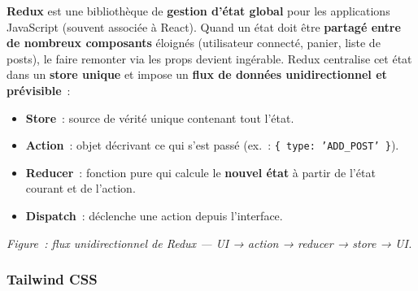 \noindent \textbf{Redux} est une bibliothèque de \textbf{gestion d'état global} pour les applications JavaScript (souvent associée à React). Quand un état doit être \textbf{partagé entre de nombreux composants} éloignés (utilisateur connecté, panier, liste de posts), le faire \og{}remonter\fg{} via les props devient ingérable. Redux centralise cet état dans un \textbf{store unique} et impose un \textbf{flux de données unidirectionnel et prévisible}~:
\begin{itemize}
	\item \textbf{Store}~: source de vérité unique contenant tout l'état.
	\item \textbf{Action}~: objet décrivant \og{}ce qui s'est passé\fg{} (ex.~: \texttt{\{ type: 'ADD\_POST' \}}).
	\item \textbf{Reducer}~: fonction pure qui calcule le \textbf{nouvel état} à partir de l'état courant et de l'action.
	\item \textbf{Dispatch}~: déclenche une action depuis l'interface.
\end{itemize}
\vspace{0.5cm}
\begin{center}
\end{center}
\noindent\textit{Figure~: flux unidirectionnel de Redux — UI → action → reducer → store → UI.}

\subsubsection*{Tailwind CSS}
{}


